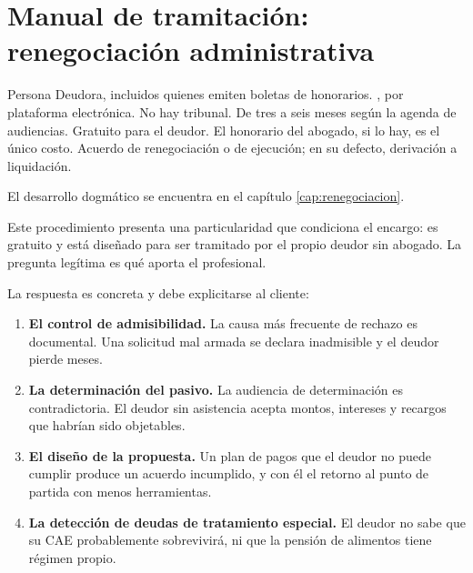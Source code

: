 \chapter{Manual de tramitación: renegociación administrativa}
\label{cap:tram-renegociacion}

\fichaProcedimiento
  {Persona Deudora, incluidos quienes emiten boletas de honorarios.}
  {\Superir{}, por plataforma electrónica. No hay tribunal.}
  {De tres a seis meses según la agenda de audiencias.}
  {Gratuito para el deudor. El honorario del abogado, si lo hay, es el único costo.}
  {Acuerdo de renegociación o de ejecución; en su defecto, derivación a liquidación.}

El desarrollo dogmático se encuentra en el capítulo \ref{cap:renegociacion}.

\bloqueEncargo

Este procedimiento presenta una particularidad que condiciona el encargo: es gratuito y
está diseñado para ser tramitado por el propio deudor sin abogado. La pregunta legítima
es qué aporta el profesional.

La respuesta es concreta y debe explicitarse al cliente:

\begin{enumerate}
  \item \textbf{El control de admisibilidad.} La causa más frecuente de rechazo es
  documental. Una solicitud mal armada se declara inadmisible y el deudor pierde meses.

  \item \textbf{La determinación del pasivo.} La audiencia de determinación es
  contradictoria. El deudor sin asistencia acepta montos, intereses y recargos que
  habrían sido objetables.

  \item \textbf{El diseño de la propuesta.} Un plan de pagos que el deudor no puede
  cumplir produce un acuerdo incumplido, y con él el retorno al punto de partida con
  menos herramientas.

  \item \textbf{La detección de deudas de tratamiento especial.} El deudor no sabe que su
  CAE probablemente sobrevivirá, ni que la pensión de alimentos tiene régimen propio.
\end{enumerate}

